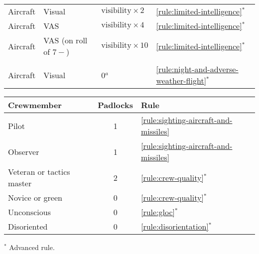 {\begin{twocolumntablefloat}
\begin{twocolumntable}
\begin{tabularx}{0.7\linewidth}{llLl}
\midrule
Aircraft&Visual&$\mbox{visibility} \times 2$&\ref{rule:limited-intelligence}$^*$\\
Aircraft&VAS&$\mbox{visibility} \times 4$&\ref{rule:limited-intelligence}$^*$\\
Aircraft&VAS (on roll of $7-$)&$\mbox{visibility} \times 10$&\ref{rule:limited-intelligence}$^*$\\
\midrule
{}\\
\midrule
Aircraft&Visual&0$^a$&\ref{rule:night-and-adverse-weather-flight}$^*$\\
\bottomrule
\end{tabularx}
\end{twocolumntable}

\vspace{\floatsep}

\begin{onecolumntable}
\small
{}
\begin{tabularx}{0.8\linewidth}{Xcl}
\toprule
Crewmember&Padlocks&Rule\\
\midrule
Pilot&1&\ref{rule:sighting-aircraft-and-missiles}\\
Observer&1&\ref{rule:sighting-aircraft-and-missiles}\\
\midrule
Veteran or tactics master&2&\ref{rule:crew-quality}$^*$\\
Novice or green&0&\ref{rule:crew-quality}$^*$\\
Unconscious&0&\ref{rule:gloc}$^*$\\
Disoriented&0&\ref{rule:disorientation}$^*$\\
\bottomrule
\end{tabularx}
\begin{tablenote}{0.7\linewidth}
$^*$ Advanced rule.
\end{tablenote}
\end{onecolumntable}

\end{twocolumntablefloat}





}
